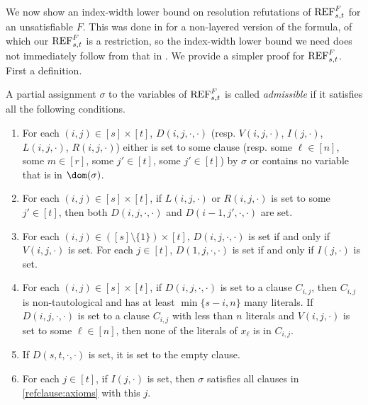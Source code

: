 We now show an index-width lower bound on resolution refutations of $\textnormal{REF}^{F}_{s,t}$ for an unsatisfiable $F$. This was done in \cite{atserias-muller2019-focs} for a non-layered version of the formula, of which our $\textnormal{REF}^{F}_{s,t}$ is a restriction, so the index-width lower bound we need does not immediately follow from that in \cite{atserias-muller2019-focs}. We provide a simpler proof for $\textnormal{REF}^{F}_{s,t}$. First a definition. 

\begin{definition} \label{def:admissible}
A partial assignment $\sigma$ to the variables of $\textnormal{REF}^{F}_{s,t}$ is called \emph{admissible} if it satisfies all the following conditions.
\begin{enumerate}[({A}1)]
\item \label{item:admissible-set-or-untouched} For each $(i,j) \in [s] \times [t]$, $D(i,j,\cdot,\cdot)$ (resp. $V(i,j,\cdot)$, $I(j,\cdot)$, $L(i,j,\cdot)$, $R(i,j,\cdot)$) either is set to some clause (resp. some $\ell \in [n]$, some $m \in [r]$, some $j' \in [t]$, some $j' \in [t]$) by $\sigma$ or contains no variable that is in $\dom(\sigma)$. 

\item \label{item:admissible-RL-implies-D} For each $(i,j) \in [s] \times [t]$, if $L(i,j,\cdot)$ or $R(i,j,\cdot)$ is set to some  $j' \in [t]$, then both $D(i,j,\cdot,\cdot)$ and $D(i-1,j',\cdot,\cdot)$ are set.

\item \label{item:admissible-D-iff-V,I} For each $(i,j) \in ([s] \setminus \{1\}) \times [t]$, $D(i,j,\cdot,\cdot)$ is set if and only if $V(i,j,\cdot)$ is set. For each $j \in [t]$,  $D(1,j,\cdot,\cdot)$ is set if and only if $I(j,\cdot)$ is set.

\item \label{item:admissible-D-nontaut-and-fat} For each $(i,j) \in [s] \times [t]$, if $D(i,j,\cdot,\cdot)$ is set to a clause $C_{i,j}$, then $C_{i,j}$ is non-tautological and has at least $\min\{s-i, n\}$ many literals. If $D(i,j,\cdot,\cdot)$ is set to a clause $C_{i,j}$ with less than $n$ literals and $V(i,j,\cdot)$ is set to some $\ell \in [n]$, then none of the literals of $x_\ell$ is in $C_{i,j}$.

\item \label{item:admissible-empty-clause} If $D(s,t, \cdot , \cdot)$ is set, it is set to the empty clause.

\item \label{item:admissible-I}For each $j \in [t]$, if $I(j,\cdot)$ is set, then $\sigma$ satisfies all clauses in \eqref{refclause:axioms} with this $j$.


\end{enumerate}
\end{definition}
